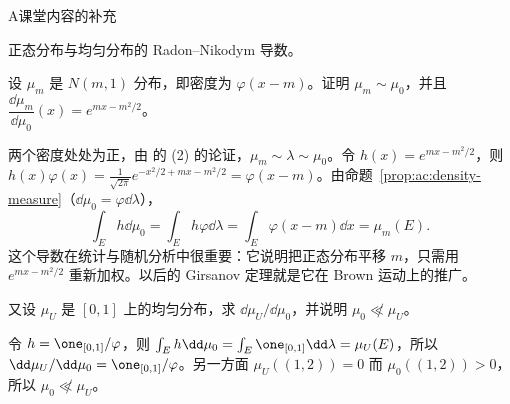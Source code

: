\begin{exercises}{A}{课堂内容的补充}
\item\label{ex:ac:A6} 正态分布与均匀分布的 Radon--Nikodym 导数。
\begin{questions}
\item 设 $\mu_m$ 是 $N(m,1)$ 分布，即密度为 $\varphi(x-m)$。证明 $\mu_m\sim\mu_0$，并且 $\dfrac{\dd\mu_m}{\dd\mu_0}(x)=e^{mx-m^2/2}$。
\begin{solution}
两个密度处处为正，由 的 (2) 的论证，$\mu_m\sim\lambda\sim\mu_0$。令 $h(x)=e^{mx-m^2/2}$，则 $h(x)\varphi(x)=\frac1{\sqrt{2\pi}}e^{-x^2/2+mx-m^2/2}=\varphi(x-m)$。由命题~\ref{prop:ac:density-measure}（$\dd\mu_0=\varphi\dd\lambda$），
\[
\int_Eh\dd\mu_0=\int_Eh\varphi\dd\lambda=\int_E\varphi(x-m)\dd x=\mu_m(E).
\]
这个导数在统计与随机分析中很重要：它说明把正态分布平移 $m$，只需用 $e^{mx-m^2/2}$ 重新加权。以后的 Girsanov 定理就是它在 Brown 运动上的推广。
\end{solution}
\item 又设 $\mu_U$ 是 $[0,1]$ 上的均匀分布，求 $\dd\mu_U/\dd\mu_0$，并说明 $\mu_0\not\ll\mu_U$。
\begin{solution}
令 $h=\one_{[0,1]}/\varphi$，则 $\int_Eh\dd\mu_0=\int_E\one_{[0,1]}\dd\lambda=\mu_U(E)$，所以 $\dd\mu_U/\dd\mu_0=\one_{[0,1]}/\varphi$。另一方面 $\mu_U((1,2))=0$ 而 $\mu_0((1,2))>0$，所以 $\mu_0\not\ll\mu_U$。
\end{solution}
\end{questions}


\end{exercises}
